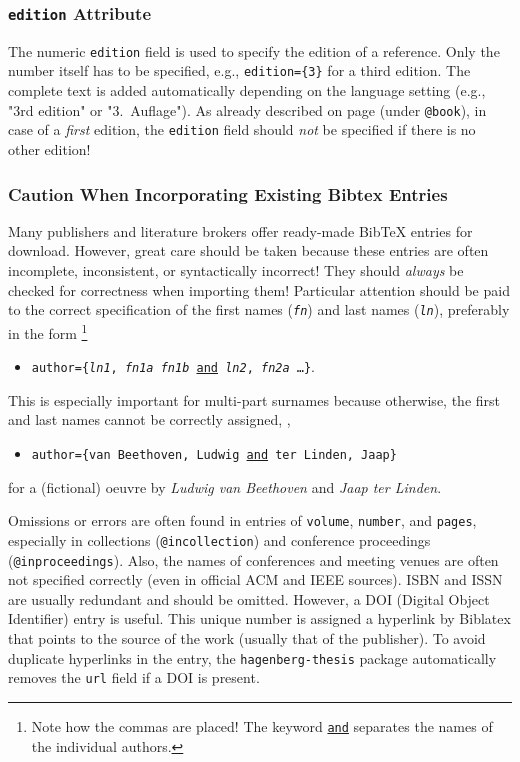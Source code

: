 \subsubsection{\texttt{edition} Attribute}

The numeric \texttt{edition} field is used to specify the edition of a
reference. Only the number itself has to be specified, e.g., \verb!edition={3}!
for a third edition. The complete text is added automatically depending on the
language setting (e.g., "3rd edition" or "3.\ Auflage"). As already described on
page \pageref{sec:@book} (under \texttt{@book}), in case of a
\emph{first} edition, the \texttt{edition} field should
\emph{not} be specified if there is no other edition!

\subsubsection{Caution When Incorporating Existing Bibtex Entries}

Many publishers and literature brokers offer ready-made BibTeX entries for
download. However, great care should be taken because these entries are often
incomplete, inconsistent, or syntactically incorrect! They should \emph{always}
be checked for correctness when importing them! Particular attention should be
paid to the correct specification of the first names (\texttt{\textit{fn}}) and
last names (\texttt{\textit{ln}}), preferably in the form%
\footnote{Note how the commas are placed! The keyword \underline{\texttt{and}}
separates the names of the individual authors.}
%
\begin{itemize}
\item[]
\texttt{author=\{\textit{ln1}, \textit{fn1a} \emph{fn1b} \underline{and}
\textit{ln2}, \textit{fn2a} \ldots \}}.
\end{itemize}
%
This is especially important for multi-part surnames because otherwise, the
first and last names cannot be correctly assigned, \eg,
%
\begin{itemize}
\item[]
\texttt{author=\{van Beethoven, Ludwig \underline{and} ter Linden, Jaap\}}
\end{itemize}
%
for a (fictional) oeuvre by \emph{Ludwig van Beethoven} and \emph{Jaap ter
Linden}.

Omissions or errors are often found in entries of \texttt{volume},
\texttt{number}, and \texttt{pages}, especially in collections
(\texttt{@incollection}) and conference proceedings (\texttt{@inproceedings}).
Also, the names of conferences and meeting venues are often not specified
correctly (even in official ACM and IEEE sources). ISBN and ISSN are usually
redundant and should be omitted. However, a DOI (Digital Object Identifier)
entry is useful. This unique number is assigned a hyperlink by Biblatex that
points to the source of the work (usually that of the publisher). To avoid
duplicate hyperlinks in the entry, the \texttt{hagenberg-thesis} package
automatically removes the \texttt{url} field if a DOI is present.

